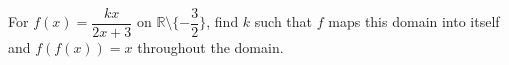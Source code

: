 For $f(x)=\dfrac{kx}{2x+3}$ on $\mathbb R\setminus\{-\dfrac{3}{2}\}$, find $k$ such that $f$ maps this domain into itself and $f(f(x))=x$ throughout the domain.
